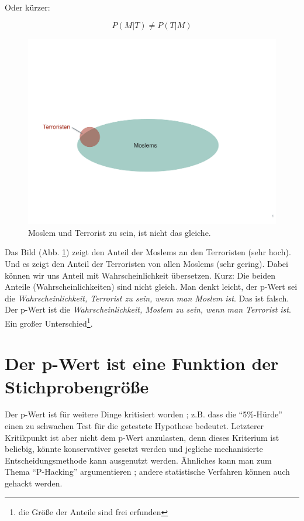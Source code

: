 \documentclass[12pt,ngerman,]{book}
\let\rmarkdownfootnote\footnote%
\def\footnote{\protect\rmarkdownfootnote}
\begin{document}
Oder kürzer:

\[ P(M|T) \ne P(T|M) \]

\begin{figure}

{\centering \includegraphics[width=0.7\linewidth]{images/moslems_terroristen} 

}

\caption{Moslem und Terrorist zu sein, ist nicht das gleiche.}\label{fig:moslems-terroristen}
\end{figure}

Das Bild (Abb. \ref{fig:moslems-terroristen}) zeigt den Anteil der
Moslems an den Terroristen (sehr hoch). Und es zeigt den Anteil der
Terroristen von allen Moslems (sehr gering). Dabei können wir uns Anteil
mit Wahrscheinlichkeit übersetzen. Kurz: Die beiden Anteile
(Wahrscheinlichkeiten) sind nicht gleich. Man denkt leicht, der p-Wert
sei die \emph{Wahrscheinlichkeit, Terrorist zu sein, wenn man Moslem
ist}. Das ist falsch. Der p-Wert ist die \emph{Wahrscheinlichkeit,
Moslem zu sein, wenn man Terrorist ist}. Ein großer
Unterschied\footnote{die Größe der Anteile sind frei erfunden}.

\section{Der p-Wert ist eine Funktion der
Stichprobengröße}\label{der-p-wert-ist-eine-funktion-der-stichprobengroe}

Der p-Wert ist für weitere Dinge kritisiert worden
\citep[\citet{uncertainty}]{Wagenmakers2007}; z.B. dass die
``5\%-Hürde'' einen zu schwachen Test für die getestete Hypothese
bedeutet. Letzterer Kritikpunkt ist aber nicht dem p-Wert anzulasten,
denn dieses Kriterium ist beliebig, könnte konservativer gesetzt werden
und jegliche mechanisierte Entscheidungsmethode kann ausgenutzt werden.
Ähnliches kann man zum Thema ``P-Hacking'' argumentieren
\citep[\citet{Wicherts2016}]{Head2015}; andere statistische Verfahren
können auch gehackt werden.
\end{document}
